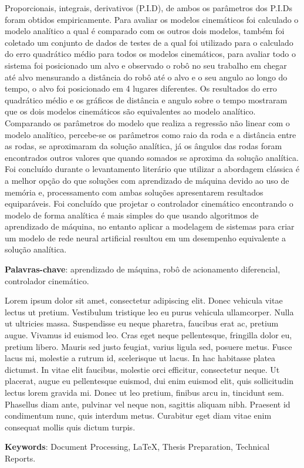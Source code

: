 Proporcionais, integrais, derivativos (P.I.D),
de ambos os parâmetros dos P.I.Ds foram obtidos empiricamente.
Para avaliar os modelos cinemáticos foi calculado o modelo analítico a qual
é comparado com os outros dois modelos, também foi coletado um conjunto de
dados de testes de a qual foi utilizado para o calculado do erro quadrático
médio para todos os modelos cinemáticos,
para avaliar todo o sistema foi posicionado um alvo e observado o robô no 
seu trabalho em chegar até alvo mensurando a distância do robô até o
alvo e o seu angulo ao longo do tempo, o alvo foi posicionado em 4 lugares
diferentes. Os resultados do erro quadrático médio e os
gráficos de distância e angulo sobre o tempo 
mostraram que os dois modelos cinemáticos são equivalentes ao modelo
analítico. Comparando os parâmetros do modelo que realiza a
regressão não linear com o modelo analítico,
percebe-se os parâmetros como raio da roda e a distância entre as rodas,
se aproximaram da solução analítica, já os ângulos das rodas foram
encontrados outros valores que quando somados se aproxima da solução
analítica. Foi concluído durante o levantamento literário que
utilizar a abordagem clássica é a melhor opção do que soluções com
aprendizado de máquina devido ao uso de memória e,
processamento com ambas soluções apresentarem resultados equiparáveis.
Foi concluído que projetar o controlador cinemático encontrando o modelo
de forma analítica é mais simples do que usando algoritmos de aprendizado
de máquina, no entanto aplicar a modelagem  de sistemas para criar um
modelo de rede neural artificial resultou em um desempenho equivalente
a solução analítica.




\vspace{1.5ex}

{\bf Palavras-chave}: aprendizado de máquina, robô de acionamento diferencial,
controlador cinemático.

%
%

Lorem ipsum dolor sit amet, consectetur adipiscing elit. Donec vehicula vitae lectus ut pretium. Vestibulum tristique leo eu purus vehicula ullamcorper. Nulla ut ultricies massa. Suspendisse eu neque pharetra, faucibus erat ac, pretium augue. Vivamus id euismod leo. Cras eget neque pellentesque, fringilla dolor eu, pretium libero. Mauris sed justo feugiat, varius ligula sed, posuere metus. Fusce lacus mi, molestie a rutrum id, scelerisque ut lacus. In hac habitasse platea dictumst. In vitae elit faucibus, molestie orci efficitur, consectetur neque. Ut placerat, augue eu pellentesque euismod, dui enim euismod elit, quis sollicitudin lectus lorem gravida mi. Donec ut leo pretium, finibus arcu in, tincidunt sem. Phasellus diam ante, pulvinar vel neque non, sagittis aliquam nibh. Praesent id condimentum nunc, quis interdum metus. Curabitur eget diam vitae enim consequat mollis quis dictum turpis.

\vspace{1.5ex}

{\bf Keywords}: Document Processing, \LaTeX, Thesis Preparation,
Technical Reports.
